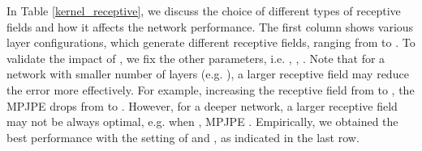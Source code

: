 \documentclass[twocolumn]{svjour3}          \smartqed  \usepackage{graphicx}
\begin{document}
In Table \ref{kernel_receptive}, we discuss the choice of different types of receptive fields and how it affects the network performance. The first column shows various layer configurations, which generate different receptive fields, ranging from  to . To validate the impact of , we fix the other parameters, i.e. , , . Note that for a network with smaller number of layers (e.g. ), a larger receptive field may reduce the error more effectively. For example, increasing the receptive field from  to , the MPJPE drops from  to  . However, for a deeper network, a larger receptive field may not be always optimal, e.g. when , MPJPE . Empirically, we obtained the best performance with the setting of  and , as indicated in the last row.

\begin{table}[ht]
    \begin{center}
    \end{center}
    \caption{Ablation study on different receptive fields in our kernel attention model. The evaluation is performed on Human3.6M under  with MPJPE (mm).}
    \label{kernel_receptive}
\end{table}
\end{document}
